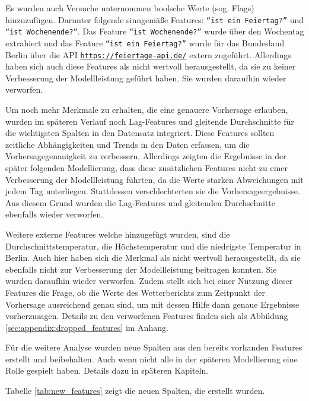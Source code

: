 \documentclass[%
pdftex,
oneside,			%
11pt,				%
parskip=half,		%
headheight = 12pt,	%
headsepline,		%
footsepline,		%
footheight = 16pt,	%
abstracton,		%
DIV=calc,		%
BCOR=8mm,		%
headinclude=false,	%
footinclude=false,	%
listof=totoc,		%
toc=bibliography,	%
]{scrreprt}	%
\begin{document}
            Es wurden auch Versuche unternommen boolsche Werte (sog. Flags) hinzuzufügen.
            Darunter folgende sinngemäße Features: \texttt{\enquote{ist ein Feiertag?}} und \texttt{\enquote{ist Wochenende?}}. 
            Das Feature \texttt{\enquote{ist Wochenende?}} wurde über den Wochentag extrahiert und das Feature \texttt{\enquote{ist ein Feiertag?}} wurde für das Bundesland Berlin über die API \texttt{\url{https://feiertage-api.de/}} extern zugeführt.
            Allerdings haben sich auch diese Features als nicht wertvoll herausgestellt, da sie zu keiner Verbesserung der Modellleistung geführt haben.
            Sie wurden daraufhin wieder verworfen.

            Um noch mehr Merkmale zu erhalten, die eine genauere Vorhersage erlauben, wurden im späteren Verlauf noch Lag-Features und gleitende Durchschnitte für die wichtigsten Spalten in den Datensatz integriert. 
            Diese Features sollten zeitliche Abhängigkeiten und Trends in den Daten erfassen, um die Vorhersagegenauigkeit zu verbessern. 
            Allerdings zeigten die Ergebnisse in der später folgenden Modellierung, dass diese zusätzlichen Features nicht zu einer Verbesserung der Modellleistung führten, da die Werte starken Abweichungen mit jedem Tag unterliegen.
            Stattdessen verschlechterten sie die Vorhersageergebnisse. 
            Aus diesem Grund wurden die Lag-Features und gleitenden Durchschnitte ebenfalls wieder verworfen.

            Weitere externe Features welche hinzugefügt wurden, sind die Durchschnittstemperatur, die Höchstemperatur und die niedrigste Temperatur in Berlin.
            Auch hier haben sich die Merkmal als nicht wertvoll herausgestellt, da sie ebenfalls nicht zur Verbesserung der Modellleistung beitragen konnten.
            Sie wurden daraufhin wieder verworfen.
            Zudem stellt sich bei einer Nutzung dieser Features die Frage, ob die Werte des Wetterberichts zum Zeitpunkt der Vorhersage ausreichend genau sind, um mit dessen Hilfe dann genaue Ergebnisse vorherzusagen.
            Details zu den verworfenen Features finden sich als Abbildung \ref{sec:appendix:dropped_features} im Anhang. 

            Für die weitere Analyse wurden neue Spalten aus den bereits vorhanden Features erstellt und beibehalten.
            Auch wenn nicht alle in der späteren Modellierung eine Rolle gespielt haben.
            Details dazu in späteren Kapiteln. 

            Tabelle \ref{tab:new_features} zeigt die neuen Spalten, die erstellt wurden.
\end{document}
